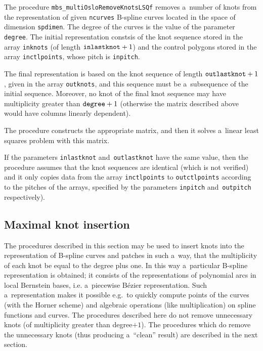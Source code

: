 \vspace{\bigskipamount}
The procedure \texttt{mbs\_multiOsloRemoveKnotsLSQf} removes a~number
of knots from the representation of given \texttt{ncurves} B-spline curves
located in the space of dimension \texttt{spdimen}.
The degree of the curves is the value of the parameter \texttt{degree}.
The initial representation constsis of the knot sequence stored in the
array \texttt{inknots} (of length $\mathord{\mbox{\texttt{inlastknot}}}+1$)
and the control polygons stored in the array \texttt{inctlpoints},
whose pitch is \texttt{inpitch}.

The final representation is based on the knot sequence of length
$\mathord{\mbox{\texttt{outlastknot}}}+1$, given in the array
\texttt{outknots}, and this sequence must be a~subsequence of
the initial sequence. Moreover, no knot of the final knot sequence may have
multiplicity greater than $\mathord{\mbox{\texttt{degree}}}+1$ (otherwise
the matrix described above would have columns linearly dependent).

The procedure constructs the appropriate matrix, and then it solves a~linear
least squares problem with this matrix.

If the parameters \texttt{inlastknot} and~\texttt{outlastknot}
have the same value, then the procedure assumes that the knot
sequences are identical (which is not verified) and it only copies
data from the array \texttt{inctlpoints} to \texttt{outctlpoints}
according to the pitches of the arrays, specified by the parameters
\texttt{inpitch} and~\texttt{outpitch} respectively).


\subsection{\label{ssect:max:knot:ins}Maximal knot insertion}

The procedures described in this section may be used to insert knots
into the representation of B-spline curves and patches in such a~way,
that the multiplicity of each knot be equal to the degree plus one.
In this way a~particular B-spline representation is obtained; it consists
of the representations of polynomial arcs in local Bernstein bases,
i.e. a~piecewise B\'{e}zier representation. Such a~representation
makes it possible e.g.\ to quickly compute points of the curves
(with the Horner scheme) and algebraic operations (like multiplication)
on spline functions and curves. The procedures described here do not
remove unnecessary knots (of multiplicity greater than degree$+1$).
The procedures which do remove the unnecessary knots (thus producing
a~``clean'' result) are described in the next section.

